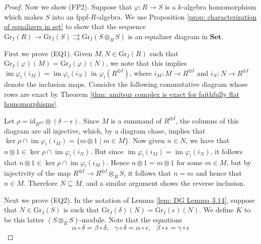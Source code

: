 \documentclass[oneside,11pt]{amsart}
\newcommand{\bSet}{\ensuremath{\textbf{Set}}}
\newcommand{\id}{\ensuremath{\text{id}}}
\newcommand{\Gr}{\ensuremath{\text{Gr}}}
\newcommand{\im}{\operatorname{im}}
\theoremstyle{definition}
\newtheorem{proof techniques}{Proof Techniques}
\begin{document}
\begin{proof}
Now we show (FP2). Suppose that $\varphi: R \to S$ is a $k$-algebra homomorphism which makes $S$ into an fppf-$R$-algebra. We use Proposition \ref{prop: characterization of equalizers in set} to show that the sequence $\Gr_I(R) \to \Gr_I(S) \rightrightarrows \Gr_I(S \otimes_R S)$ is an equalizer diagram in $\bSet$. 

First we prove (EQ1). Given $M , N \in \Gr_I(R)$ such that $\Gr_I(\varphi)(M) = \Gr_I(\varphi)(N)$, we note that this implies $\im \varphi_!(i_M) = \im \varphi_!(i_N)$ in $\varphi_! (R^{\oplus I})$, where $i_M : M \to R^{\oplus I}$ and $i_N : N  \to R^{\oplus I}$ denote the inclusion maps. Consider the following commutative diagram whose rows are exact by Theorem \ref{thm: amitsur complex is exact for faithfully flat homomorphisms}. 
\begin{center}
\end{center}
Let $\rho = \id_{R^{\oplus I}} \otimes (\delta - \epsilon)$. Since $M$ is a summand of $R^{\oplus I}$, the columns of this diagram are all injective, which, by a diagram chase, implies that $\ker \rho \cap \im \varphi_!(i_M) = \{ m \otimes 1 \mid m \in M \}$. Now given $n \in N$, we have that $n \otimes 1 \in \ker \rho \cap \im \varphi_!(i_N)$. But since $\im \varphi_!(i_M) = \im \varphi_!(i_N)$, it follows that $n \otimes 1 \in \ker \rho \cap \im \varphi_!(i_M)$. Hence $n \otimes 1 = m \otimes 1$ for some $m \in M$, but by injectivity of the map $R^{\oplus I} \to R^{\oplus I} \otimes_R S$, it follows that $n = m$ and hence that $n \in M$. Therefore $N \subseteq M$, and a similar argument shows the reverse inclusion. 

Next we prove (EQ2). In the notation of Lemma \ref{lem: DG Lemma 3.14}, suppose that $N \in \Gr_I(S)$ is such that $\Gr_I(\delta)(N) = \Gr_I(\epsilon)(N)$. We define $K$ to be this latter $(S \otimes_R S)$-module. Note that the equations
\begin{equation}\label{eq: ring homomorphism composition equality}
\alpha \circ \delta = \beta \circ \delta, \ \ \ \gamma \circ \delta = \alpha \circ \epsilon, \ \ \ \beta \circ \epsilon = \gamma \circ \epsilon
\end{equation}


\end{proof}
\end{document}

